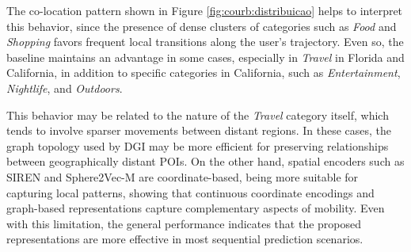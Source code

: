 

The co-location pattern shown in Figure \ref{fig:courb:distribuicao} helps to interpret this behavior, since the presence of dense clusters of categories such as \textit{Food} and \textit{Shopping} favors frequent local transitions along the user's trajectory. Even so, the baseline maintains an advantage in some cases, especially in \textit{Travel} in Florida and California, in addition to specific categories in California, such as \textit{Entertainment}, \textit{Nightlife}, and \textit{Outdoors}.

This behavior may be related to the nature of the \textit{Travel} category itself, which tends to involve sparser movements between distant regions. In these cases, the graph topology used by DGI may be more efficient for preserving relationships between geographically distant POIs. On the other hand, spatial encoders such as SIREN and Sphere2Vec-M are coordinate-based, being more suitable for capturing local patterns, showing that continuous coordinate encodings and graph-based representations capture complementary aspects of mobility. Even with this limitation, the general performance indicates that the proposed representations are more effective in most sequential prediction scenarios.
